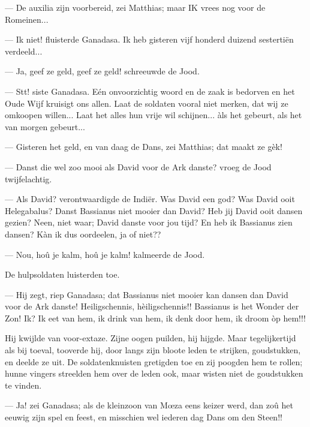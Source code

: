 \documentclass[a4paper, 12pt, oneside, dutch]{article}
\begin{document}
--- De auxilia zijn voorbereid, zei Matthias; maar IK vrees nog voor de Romeinen...

--- Ik niet! fluisterde Ganadasa. Ik heb gisteren vijf honderd duizend sestertiën verdeeld...

--- Ja, geef ze geld, geef ze geld! schreeuwde de Jood.

--- Stt! siste Ganadasa. Eén onvoorzichtig woord en de zaak is bedorven en het Oude Wijf kruisigt ons allen. Laat de soldaten vooral niet merken, dat wij ze omkoopen willen... Laat het alles hun vrije wil schijnen... àls het gebeurt, als het van morgen gebeurt...

--- Gisteren het geld, en van daag de Dans, zei Matthias; dat maakt ze gèk!

--- Danst die wel zoo mooi als David voor de Ark danste? vroeg de Jood twijfelachtig.

--- Als David? verontwaardigde de Indiër. Was David een god? Was David ooit Helegabalus? Danst Bassianus niet mooier dan David? Heb jij David ooit dansen gezien? Neen, niet waar; David danste voor jou tijd? En heb ik Bassianus zien dansen? Kàn ik dus oordeelen, ja of niet??

--- Nou, hoû je kalm, hoû je kalm! kalmeerde de Jood.

De hulpsoldaten luisterden toe.

--- Hij zegt, riep Ganadasa; dat Bassianus niet mooier kan dansen dan David voor de Ark danste! Heiligschennis, hèiligschennis!! Bassianus is het Wonder der Zon! Ik? Ik eet van hem, ik drink van hem, ik denk door hem, ik droom òp hem!!!

Hij kwijlde van voor-extaze. Zijne oogen puilden, hij hijgde. Maar tegelijkertijd als bij toeval, tooverde hij, door langs zijn bloote leden te strijken, goudstukken, en deelde ze uit. De soldatenknuisten gretigden toe en zij poogden hem te rollen; hunne vingers streelden hem over de leden ook, maar wisten niet de goudstukken te vinden.

--- Ja! zei Ganadasa; als de kleinzoon van Mœza eens keizer werd, dan zoû het eeuwig zijn spel en feest, en misschien wel iederen dag Dans om den Steen!!
\end{document}

